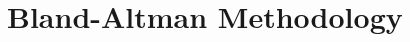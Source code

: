 \documentclass{report}
\begin{document}
\tableofcontents
\newpage
\chapter{Bland-Altman Methodology}



%
\end{document}
